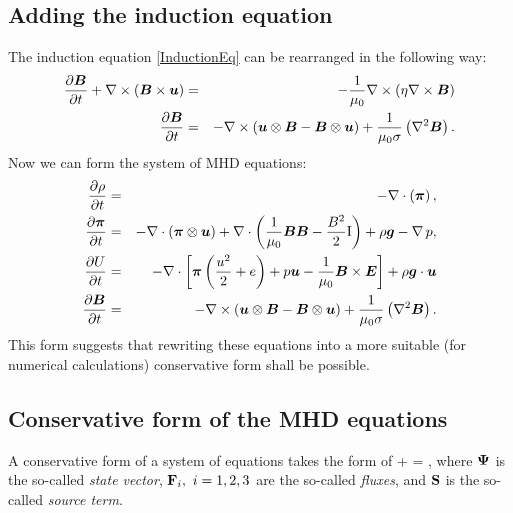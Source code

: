 \subsection{Adding the induction equation}
The induction equation \ref{InductionEq} can be rearranged in the following way:
\begin{eqnarray}
\frac{\partial{\mbox{\boldmath $B$}}}{\partial{t}} + \nabla \times \left( \mbox{\boldmath $B$} \times \mbox{\boldmath $u$} \right) & = & -\frac{1}{\mu_0} \nabla \times \left( \eta \nabla \times \mbox{\boldmath $B$} \right)\\
\label{InductionPreFinal} \frac{\partial{\mbox{\boldmath $B$}}}{\partial{t}} & = & - \nabla \times \left( \mbox{\boldmath $u$} \otimes \mbox{\boldmath $B$} - \mbox{\boldmath $B$} \otimes \mbox{\boldmath $u$} \right) + \frac{1}{\mu_{0}\sigma} \left( \nabla^2 \mbox{\boldmath $B$} \right).
\end{eqnarray}
Now we can form the system of MHD equations:
\begin{eqnarray}
\label{ContinuityEqFinal} \frac{\partial{\rho}}{\partial{t}} & = & - \nabla\cdot\left(\mbox{\boldmath $\pi$}\right),\\
\label{NSEqFinal} \frac{\partial{\mbox{\boldmath $\pi$}}}{\partial{t}} & = & - \nabla\cdot\left(\mbox{\boldmath $\pi$}\otimes\mbox{\boldmath $u$}\right) + \nabla\cdot\left(\frac{1}{\mu_0}\mbox{\boldmath $B$}\mbox{\boldmath $B$} - \frac{B^2}{2}\mathrm{I}\right) + \rho\mbox{\boldmath $g$} - \nabla\,p,\\
\label{EnergyEqFinal} \frac{\partial{U}}{\partial{t}} & = & -\nabla\cdot\left[\mbox{\boldmath $\pi$}\left( \frac{u^2}{2} + e\right) + p \mbox{\boldmath $u$} - \frac{1}{\mu_0}\mbox{\boldmath $B$}\times\mbox{\boldmath $E$}\right] + \rho \mbox{\boldmath $g$} \cdot \mbox{\boldmath $u$}\\
\label{InductionFinal} \frac{\partial{\mbox{\boldmath $B$}}}{\partial{t}} & = & - \nabla \times \left( \mbox{\boldmath $u$} \otimes \mbox{\boldmath $B$} - \mbox{\boldmath $B$} \otimes \mbox{\boldmath $u$} \right) + \frac{1}{\mu_{0}\sigma} \left( \nabla^2 \mbox{\boldmath $B$} \right).
\end{eqnarray}
This form suggests that rewriting these equations into a more suitable (for numerical calculations) conservative form shall be possible.
\subsection{Conservative form of the MHD equations}
A conservative form of a system of equations takes the form of
\be
\label{conservativeGeneric}  + \nabla \cdot \mrF\lo\mrPsi\ro = \mrS,
\ee
where $\mathrm{\mathbf{\Psi}}$ is the so-called \textit{state vector}, $\mathrm{\mathbf{F}}_i,\ i = 1, 2, 3$ are the so-called \textit{fluxes}, and $\mathrm{\mathbf{S}}$ is the so-called \textit{source term}.
